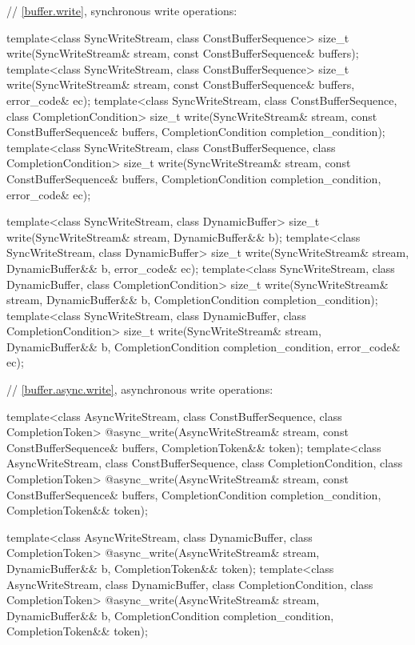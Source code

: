 \begin{codeblock}
{{{  // \ref{buffer.write}, synchronous write operations:

  template<class SyncWriteStream, class ConstBufferSequence>
    size_t write(SyncWriteStream& stream,
                 const ConstBufferSequence& buffers);
  template<class SyncWriteStream, class ConstBufferSequence>
    size_t write(SyncWriteStream& stream,
                 const ConstBufferSequence& buffers, error_code& ec);
  template<class SyncWriteStream, class ConstBufferSequence,
    class CompletionCondition>
      size_t write(SyncWriteStream& stream,
                   const ConstBufferSequence& buffers,
                   CompletionCondition completion_condition);
  template<class SyncWriteStream, class ConstBufferSequence,
    class CompletionCondition>
      size_t write(SyncWriteStream& stream,
                   const ConstBufferSequence& buffers,
                   CompletionCondition completion_condition,
                   error_code& ec);

  template<class SyncWriteStream, class DynamicBuffer>
    size_t write(SyncWriteStream& stream, DynamicBuffer&& b);
  template<class SyncWriteStream, class DynamicBuffer>
    size_t write(SyncWriteStream& stream, DynamicBuffer&& b, error_code& ec);
  template<class SyncWriteStream, class DynamicBuffer, class CompletionCondition>
    size_t write(SyncWriteStream& stream, DynamicBuffer&& b,
                 CompletionCondition completion_condition);
  template<class SyncWriteStream, class DynamicBuffer, class CompletionCondition>
    size_t write(SyncWriteStream& stream, DynamicBuffer&& b,
                 CompletionCondition completion_condition, error_code& ec);

  // \ref{buffer.async.write}, asynchronous write operations:

  template<class AsyncWriteStream, class ConstBufferSequence,
    class CompletionToken>
      @\DEDUCED@ async_write(AsyncWriteStream& stream,
                          const ConstBufferSequence& buffers,
                          CompletionToken&& token);
  template<class AsyncWriteStream, class ConstBufferSequence,
    class CompletionCondition, class CompletionToken>
      @\DEDUCED@ async_write(AsyncWriteStream& stream,
                          const ConstBufferSequence& buffers,
                          CompletionCondition completion_condition,
                          CompletionToken&& token);

  template<class AsyncWriteStream, class DynamicBuffer, class CompletionToken>
    @\DEDUCED@ async_write(AsyncWriteStream& stream,
                     DynamicBuffer&& b, CompletionToken&& token);
  template<class AsyncWriteStream, class DynamicBuffer,
    class CompletionCondition, class CompletionToken>
      @\DEDUCED@ async_write(AsyncWriteStream& stream,
                          DynamicBuffer&& b,
                          CompletionCondition completion_condition,
                          CompletionToken&& token);

}}}
\end{codeblock}
